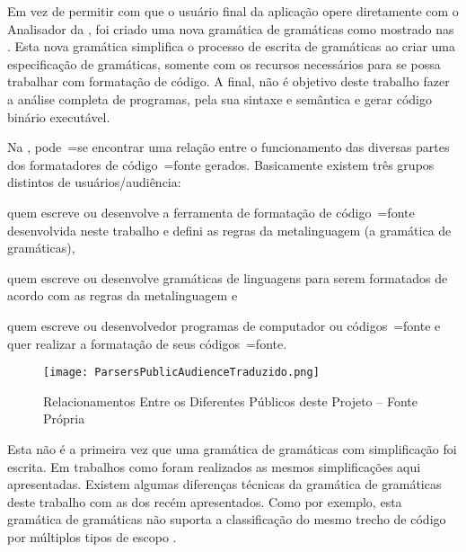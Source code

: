 Em vez de permitir com que o usuário final da aplicação opere diretamente com o Analisador da ,
foi criado uma nova gramática de gramáticas como mostrado nas .
Esta nova gramática simplifica o processo de escrita de gramáticas ao criar uma especificação de gramáticas,
somente com os recursos necessários para se possa trabalhar com formatação de código.
A final,
não é objetivo deste trabalho fazer a análise completa de programas,
pela sua sintaxe e
semântica e
gerar código binário executável.

Na ,
pode~=se encontrar uma relação entre o funcionamento das diversas partes dos formatadores de código~=fonte gerados.
Basicamente existem três grupos distintos de usuários\slash{}audiência:
\begin{inparaenum}[1)]
\item quem escreve ou
desenvolve a ferramenta de formatação de código~=fonte desenvolvida neste trabalho e
defini as regras da metalinguagem (a gramática de gramáticas),
\item quem escreve ou
desenvolve gramáticas de linguagens para serem formatados de acordo com as regras da metalinguagem e
\item quem escreve ou
desenvolvedor programas de computador ou
códigos~=fonte e
quer realizar a formatação de seus códigos~=fonte.
\end{inparaenum}%
\begin{figure}[h]
\centering
\texttt{[image: ParsersPublicAudienceTraduzido.png]}
\caption[Relacionamentos entre os Diferentes Públicos deste Projeto]{Relacionamentos Entre os Diferentes Públicos deste Projeto -- Fonte Própria}
\label{ParsersPublicAudienceTraduzido}
\end{figure}

Esta não é a primeira vez que uma gramática de gramáticas com simplificação foi escrita.
Em trabalhos como  foram realizados as mesmos simplificações aqui apresentadas.
Existem algumas diferenças técnicas da gramática de gramáticas deste trabalho com as dos recém apresentados.
Como por exemplo,
esta gramática de gramáticas não suporta a classificação do mesmo trecho de código por múltiplos tipos de escopo \cite{vsCodeSyntaxHighlighthing}.

